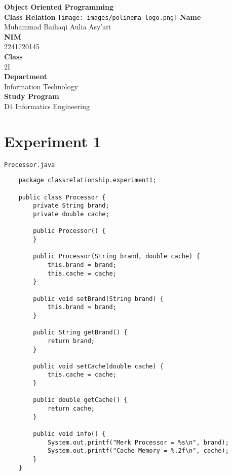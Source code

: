 \documentclass[12pt,titlepage]{article}
\newcommand{\vSubject}{Object Oriented Programming}
\newcommand{\vSubtitle}{Class Relation}
\newcommand{\vName}{Muhammad Baihaqi Aulia Asy'ari}
\newcommand{\vNIM}{2241720145}
\newcommand{\vClass}{2I}
\newcommand{\vDepartment}{Information Technology}
\newcommand{\vStudyProgram}{D4 Informatics Engineering}
\begin{document}
\begin{titlepage}
    \centering
    \vfill
    {\bfseries\LARGE
        \vSubject\\
        \vskip0.25cm
        \vSubtitle
    }
    \vfill
    \texttt{[image: images/polinema-logo.png]}
    \vfill
    {
        \textbf{Name}\\
        \vName\\
        \vskip0.5cm
        \textbf{NIM}\\
        \vNIM\\
        \vskip0.5cm
        \textbf{Class}\\
        \vClass\\
        \vskip0.5cm
        \textbf{Department}\\
        \vDepartment\\
        \vskip0.5cm
        \textbf{Study Program}\\
        \vStudyProgram
    }
\end{titlepage}

\newpage

\tableofcontents

\newpage

\section{Experiment 1}
\noindent \texttt{Processor.java}
\begin{verbatim}
    package classrelationship.experiment1;

    public class Processor {
        private String brand;
        private double cache;

        public Processor() {
        }

        public Processor(String brand, double cache) {
            this.brand = brand;
            this.cache = cache;
        }

        public void setBrand(String brand) {
            this.brand = brand;
        }

        public String getBrand() {
            return brand;
        }

        public void setCache(double cache) {
            this.cache = cache;
        }

        public double getCache() {
            return cache;
        }

        public void info() {
            System.out.printf("Merk Processor = %s\n", brand);
            System.out.printf("Cache Memory = %.2f\n", cache);
        }
    }
\end{verbatim}
\end{document}
